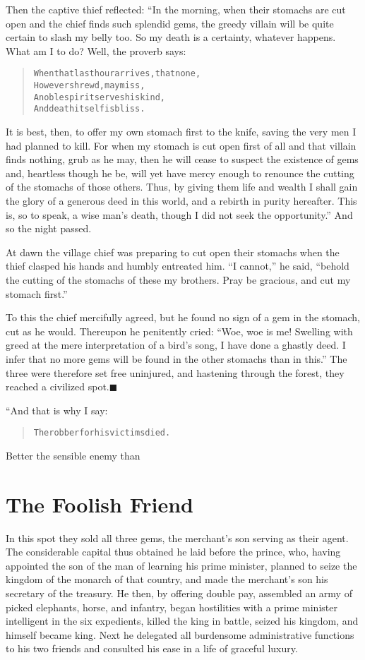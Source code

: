 \documentclass[article, twoside, 14pt]{memoir}
\newcommand{\qed}{\hfill \ensuremath{\blacksquare}}
\renewenvironment{verbatim}{%
\begin{quote}%
\vskip -10pt%
\begin{alltt}\normalfont\large}{\end{alltt}%
\end{quote}%
\vskip -10pt
} %
\begin{document}
Then the captive thief reflected: “In the morning, when their
stomachs are cut open and the chief finds such splendid gems, the
greedy villain will be quite certain to slash my belly too. So my
death is a certainty, whatever happens. What am I to do? Well, the
proverb says:

\begin{verbatim}
When that last hour arrives, that none,
    However shrewd, may miss,
A noble spirit serves his kind,
    And death itself is bliss.
\end{verbatim}
It is best, then, to offer my own stomach first to the knife,
saving the very men I had planned to kill. For when my stomach is
cut open first of all and that villain finds nothing, grub as he
may, then he will cease to suspect the existence of gems and,
heartless though he be, will yet have mercy enough to renounce the
cutting of the stomachs of those others. Thus, by giving them life
and wealth I shall gain the glory of a generous deed in this world,
and a rebirth in purity hereafter. This is, so to speak, a wise
man's death, though I did not seek the opportunity.” And so the
night passed.

At dawn the village chief was preparing to cut open their stomachs
when the thief clasped his hands and humbly entreated him.
``I cannot,'' he said,
``behold the cutting of the stomachs of these my brothers. Pray be gracious, and cut my stomach first.''

To this the chief mercifully agreed, but he found no sign of a gem
in the stomach, cut as he would. Thereupon he penitently cried:
``Woe, woe is me! Swelling with greed at the mere interpretation of a bird's song, I have done a ghastly deed. I infer that no more gems will be found in the other stomachs than in this.''
The three were therefore set free uninjured, and hastening through
the forest, they reached a civilized spot.\hyperref[s33]{\qed}

“And that is why I say:

\begin{verbatim}
The robber for his victims died.
\end{verbatim}
Better the sensible enemy than

\chapter{The Foolish Friend}

\label{s34}

In this spot they sold all three gems, the merchant's son serving
as their agent. The considerable capital thus obtained he laid
before the prince, who, having appointed the son of the man of
learning his prime minister, planned to seize the kingdom of
the monarch of that country, and made the merchant's son his
secretary of the treasury. He then, by offering double pay,
assembled an army of picked elephants, horse, and infantry, began
hostilities with a prime minister intelligent in the six
expedients, killed the king in battle, seized his kingdom, and
himself became king. Next he delegated all burdensome
administrative functions to his two friends and consulted his ease
in a life of graceful luxury.
\end{document}
